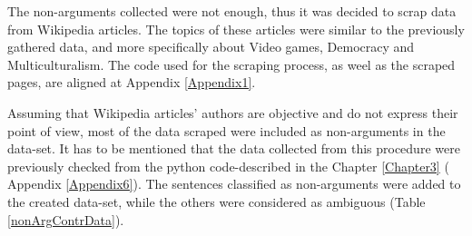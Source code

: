 The non-arguments collected were not enough, thus it was decided to scrap data from Wikipedia articles. The topics of these articles were similar to the previously gathered data, and more specifically about Video games, Democracy and Multiculturalism. The code used for the scraping process, as weel as the scraped pages, are aligned at Appendix \ref{Appendix1}. \par

\begin{table}[H]
	\centering
	\caption{Argumentative and Non-Argumentative Data Used} 
	\label{argNonArgData}
\end{table}

Assuming that Wikipedia articles' authors are objective and do not express their point of view, most of the data scraped were included as non-arguments in the data-set. It has to be mentioned that the data collected from this procedure were previously checked from the python code-described in the Chapter \ref{Chapter3} ( Appendix \ref{Appendix6}). The sentences classified as non-arguments were added to the created data-set, while the others were considered as ambiguous (Table \ref{nonArgContrData}).\par


